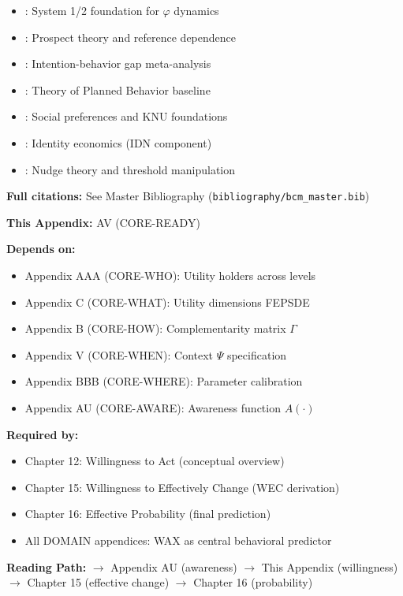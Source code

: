 \begin{itemize}[nosep]
    \item \citet{kahneman2011}: System 1/2 foundation for $\varphi$ dynamics
    \item \citet{tversky1992}: Prospect theory and reference dependence
    \item \citet{sheeran2016}: Intention-behavior gap meta-analysis
    \item \citet{ajzen1991}: Theory of Planned Behavior baseline
    \item \citet{fehr1999}: Social preferences and KNU foundations
    \item \citet{akerlof2000}: Identity economics (IDN component)
    \item \citet{PAP-thaler2008}: Nudge theory and threshold manipulation
\end{itemize}

\textbf{Full citations:} See Master Bibliography (\texttt{bibliography/bcm\_master.bib})


\begin{tcolorbox}[colback=gray!10!white, colframe=gray!75!black,
    title=\textbf{Cross-Reference Footer}]

\textbf{This Appendix:} AV (CORE-READY)

\textbf{Depends on:}
\begin{itemize}[nosep]
    \item Appendix AAA (CORE-WHO): Utility holders across levels
    \item Appendix C (CORE-WHAT): Utility dimensions FEPSDE
    \item Appendix B (CORE-HOW): Complementarity matrix $\Gamma$
    \item Appendix V (CORE-WHEN): Context $\Psi$ specification
    \item Appendix BBB (CORE-WHERE): Parameter calibration
    \item Appendix AU (CORE-AWARE): Awareness function $A(\cdot)$
\end{itemize}

\textbf{Required by:}
\begin{itemize}[nosep]
    \item Chapter 12: Willingness to Act (conceptual overview)
    \item Chapter 15: Willingness to Effectively Change (WEC derivation)
    \item Chapter 16: Effective Probability (final prediction)
    \item All DOMAIN appendices: WAX as central behavioral predictor
\end{itemize}

\textbf{Reading Path:}
$\rightarrow$ Appendix AU (awareness) $\rightarrow$ This Appendix (willingness)
$\rightarrow$ Chapter 15 (effective change) $\rightarrow$ Chapter 16 (probability)

\end{tcolorbox}



